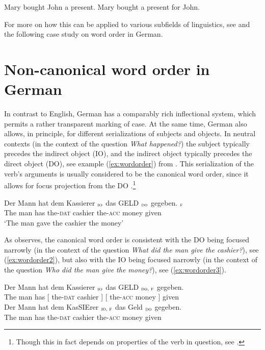 \documentclass[output=paper,colorlinks,citecolor=brown]{langscibook}
\begin{document}
\ea \label{ex:present}
    \ea \label{ex:present.dat} Mary bought John a present.
    \ex \label{ex:present.for} Mary bought a present for John.
    \z
\z

For more on how this can be applied to various subfields of linguistics, see \citet{crocker.etal2015, jaeger.buz2017} and the following case study on word order in German.



\section{Non-canonical word order in German}
In contrast to English, German has a comparably rich inflectional system, which permits a rather transparent marking of case. At the same time, German also allows, in principle, for different serializations of subjects and objects. In neutral contexts (in the context of the question \textit{What happened?}) the subject typically precedes the indirect object (IO), and the indirect object typically precedes the direct object (DO), see example (\ref{ex:wordorder}) from \citet{lenerz1977}. This serialization of the verb's arguments is usually considered to be the canonical word order, since it allows for focus projection from the DO \citep[e.g.,][]{hohle1982}.\footnote{Though this in fact depends on properties of the verb in question, see \citet{hohle1982}.}  

\ea \label{ex:wordorder}
    \gll {\ob} Der Mann hat {\ob} dem Kassierer {\cb}$_{\textsc{io}}$ {\ob} das GELD {\cb}$_{\textsc{do}}$ gegeben. {\cb}$_{\textsc{f}}$\\
     {} The man has {} the-\textsc{dat} cashier  {} {} the-\textsc{acc} money  {} given {}\\
     \glt `The man gave the cashier the money'
\z
      
As \citet{lenerz1977} observes, the canonical word order is consistent with the DO being focused narrowly (in the context of the question \textit{What did the man give the cashier?}), see (\ref{ex:wordorder2}), but also with the IO being focused narrowly (in the context of the question \textit{Who did the man give the money?}), see (\ref{ex:wordorder3}). 

\ea \label{ex:wordorder2} 
    \gll Der Mann hat {\ob} dem Kassierer {\cb}$_{\textsc{io}}$ {\ob} das GELD {\cb}$_{\textsc{do, f}}$ gegeben.\\
    The man has [ the-\textsc{dat} cashier  ] [ the-\textsc{acc} money  ] given\\
\ex \label{ex:wordorder3}
    \gll Der Mann hat {\ob} dem KasSIErer {\cb}$_{\textsc{io, f}}$ {\ob} das Geld {\cb}$_{\textsc{do}}$ gegeben.\\
    The man has {} the-\textsc{dat} cashier  {} {} the-\textsc{acc} money  {} given\\
\z
\end{document}
